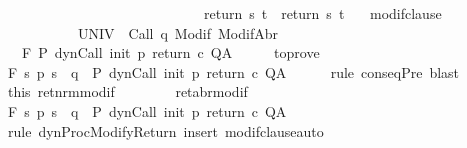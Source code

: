 \begin{isabellebody}
\ \ \ \ \ \ \ \ \ \ \ \ \ \ \ \ \ \ \ \ \ \ \ \ \ \ \ \ {\isasymlongrightarrow}\ return{\isacharprime}\ s\ t\ {\isacharequal}\ return\ s\ t{\isachardoublequoteclose}\isanewline
\ \ \ modif{\isacharunderscore}clause{\isacharcolon}\ \isanewline
\ \ \ \ \ \ \ \ \ \ {\isachardoublequoteopen}{\isasymforall}{\isasymsigma}{\isachardot}\ {\isasymGamma}{\isacharcomma}{\isasymTheta}{\isasymturnstile}\isactrlbsub {\isacharslash}UNIV\isactrlesub \ {\isacharbraceleft}{\isasymsigma}{\isacharbraceright}\ {\isacharparenleft}Call\ q{\isacharparenright}\ {\isacharparenleft}Modif\ {\isasymsigma}{\isacharparenright}{\isacharcomma}{\isacharparenleft}ModifAbr\ {\isasymsigma}{\isacharparenright}{\isachardoublequoteclose}\isanewline
\ \ \ {\isachardoublequoteopen}{\isasymGamma}{\isacharcomma}{\isasymTheta}{\isasymturnstile}\isactrlbsub {\isacharslash}F\isactrlesub \ P\ {\isacharparenleft}dynCall\ init\ p\ return\ c{\isacharparenright}\ Q{\isacharcomma}A{\isachardoublequoteclose}\isanewline
%
\isadelimproof
%
\endisadelimproof
%
\isatagproof
{}\isamarkupfalse%
\ {\isacharminus}\isanewline
\ \ \isamarkupfalse%
\ to{\isacharunderscore}prove\ \isamarkupfalse%
\ {\isachardoublequoteopen}{\isasymGamma}{\isacharcomma}{\isasymTheta}{\isasymturnstile}\isactrlbsub {\isacharslash}F\isactrlesub \ {\isacharparenleft}{\isacharbraceleft}s{\isachardot}\ p\ s\ {\isacharequal}\ q{\isacharbraceright}\ {\isasyminter}\ P{\isacharprime}{\isacharparenright}\ {\isacharparenleft}dynCall\ init\ p\ return{\isacharprime}\ c{\isacharparenright}\ Q{\isacharcomma}A{\isachardoublequoteclose}\isanewline
\ \ \ \ \isamarkupfalse%
\ {\isacharparenleft}rule\ conseqPre{\isacharparenright}\ blast\isanewline
\ \ \isamarkupfalse%
\ this\ ret{\isacharunderscore}nrm{\isacharunderscore}modif\ \isanewline
\ \ \ \ \ \ \ ret{\isacharunderscore}abr{\isacharunderscore}modif\ \isanewline
\ \ \isamarkupfalse%
\ {\isachardoublequoteopen}{\isasymGamma}{\isacharcomma}{\isasymTheta}{\isasymturnstile}\isactrlbsub {\isacharslash}F\isactrlesub \ {\isacharparenleft}{\isacharbraceleft}s{\isachardot}\ p\ s\ {\isacharequal}\ q{\isacharbraceright}\ {\isasyminter}\ P{\isacharprime}{\isacharparenright}\ {\isacharparenleft}dynCall\ init\ p\ return\ c{\isacharparenright}\ Q{\isacharcomma}A{\isachardoublequoteclose}\isanewline
\ \ \ \ \isamarkupfalse%
\ {\isacharparenleft}rule\ dynProcModifyReturn{\isacharparenright}\ {\isacharparenleft}insert\ modif{\isacharunderscore}clause{\isacharcomma}auto{\isacharparenright}\isanewline

\end{isabellebody}
